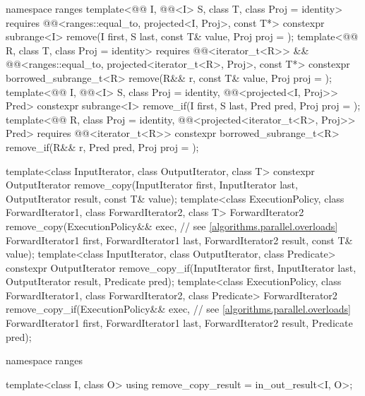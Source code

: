\begin{codeblock}
{  namespace ranges {
    template<@@ I, @@<I> S, class T, class Proj = identity>
      requires @@<ranges::equal_to, projected<I, Proj>, const T*>
      constexpr subrange<I> remove(I first, S last, const T& value, Proj proj = {});
    template<@@ R, class T, class Proj = identity>
      requires @@<iterator_t<R>> &&
               @@<ranges::equal_to,
                                         projected<iterator_t<R>, Proj>, const T*>
      constexpr borrowed_subrange_t<R>
        remove(R&& r, const T& value, Proj proj = {});
    template<@@ I, @@<I> S, class Proj = identity,
             @@<projected<I, Proj>> Pred>
      constexpr subrange<I> remove_if(I first, S last, Pred pred, Proj proj = {});
    template<@@ R, class Proj = identity,
             @@<projected<iterator_t<R>, Proj>> Pred>
      requires @@<iterator_t<R>>
      constexpr borrowed_subrange_t<R>
        remove_if(R&& r, Pred pred, Proj proj = {});
  }

  template<class InputIterator, class OutputIterator, class T>
    constexpr OutputIterator
      remove_copy(InputIterator first, InputIterator last,
                  OutputIterator result, const T& value);
  template<class ExecutionPolicy, class ForwardIterator1, class ForwardIterator2,
           class T>
    ForwardIterator2
      remove_copy(ExecutionPolicy&& exec,                       // see \ref{algorithms.parallel.overloads}
                  ForwardIterator1 first, ForwardIterator1 last,
                  ForwardIterator2 result, const T& value);
  template<class InputIterator, class OutputIterator, class Predicate>
    constexpr OutputIterator
      remove_copy_if(InputIterator first, InputIterator last,
                     OutputIterator result, Predicate pred);
  template<class ExecutionPolicy, class ForwardIterator1, class ForwardIterator2,
           class Predicate>
    ForwardIterator2
      remove_copy_if(ExecutionPolicy&& exec,                    // see \ref{algorithms.parallel.overloads}
                     ForwardIterator1 first, ForwardIterator1 last,
                     ForwardIterator2 result, Predicate pred);

  namespace ranges {
    template<class I, class O>
      using remove_copy_result = in_out_result<I, O>;

}}
\end{codeblock}
